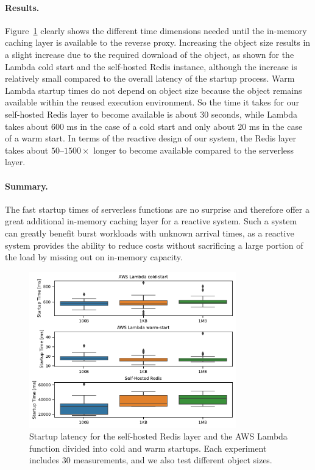 \paragraph{Results.}
Figure~\ref{fig:startup} clearly shows the different time dimensions needed until the in-memory caching layer is available to the reverse proxy. Increasing the object size results in a slight increase due to the required download of the object, as shown for the Lambda cold start and the self-hosted Redis instance, although the increase is relatively small compared to the overall latency of the startup process. Warm Lambda startup times do not depend on object size because the object remains available within the reused execution environment. So the time it takes for our self-hosted Redis layer to become available is about 30 seconds, while Lambda takes about 600 ms in the case of a cold start and only about 20 ms in the case of a warm start. In terms of the reactive design of our system, the Redis layer takes about $50$--$1500\times$ longer to become available compared to the serverless layer.

\paragraph{Summary.}
The fast startup times of serverless functions are no surprise and therefore offer a great additional in-memory caching layer for a reactive system. Such a system can greatly benefit burst workloads with unknown arrival times, as a reactive system provides the ability to reduce costs without sacrificing a large portion of the load by missing out on in-memory capacity.

\makeatletter
\setlength{\@fptop}{0pt}
\makeatother
\begin{figure}[!ht]
    \begin{center}
        \includegraphics[width=0.8\textwidth]{figures/startup.pdf}
        \caption{Startup latency for the self-hosted Redis layer and the AWS Lambda function divided into cold and warm startups. Each experiment includes 30 measurements, and we also test different object sizes.}
        \label{fig:startup}
    \end{center}
\end{figure}
